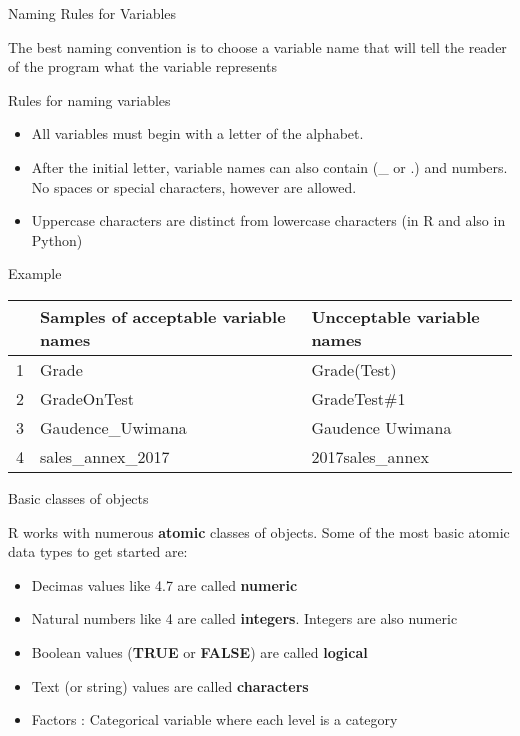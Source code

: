 \documentclass[ignorenonframetext,]{beamer}
\providecommand{\tightlist}{%
  \setlength{\itemsep}{0pt}\setlength{\parskip}{0pt}}
\begin{document}
\begin{frame}{Naming Rules for Variables}

The best naming convention is to choose a variable name that will tell
the reader of the program what the variable represents

\begin{block}{Rules for naming variables}

\begin{itemize}
\tightlist
\item
  All variables must begin with a letter of the alphabet.
\item
  After the initial letter, variable names can also contain (\_ or .)
  and numbers. No spaces or special characters, however are allowed.
\item
  Uppercase characters are distinct from lowercase characters (in R and
  also in Python)
\end{itemize}

\end{block}

\begin{block}{Example}

\begin{table}[ht]
\centering
\begin{tabular}{rll}
  \hline
& Samples of acceptable variable names & Uncceptable variable names \\ 
  \hline
1 & Grade & Grade(Test) \\ 
  2 & GradeOnTest & GradeTest\#1 \\ 
  3 & Gaudence\_Uwimana & Gaudence Uwimana \\ 
  4 & sales\_annex\_2017 & 2017sales\_annex \\ 
   \hline
\end{tabular}
\end{table}

\end{block}

\end{frame}

\begin{frame}{Basic classes of objects}

R works with numerous \textbf{atomic} classes of objects. Some of the
most basic atomic data types to get started are:

\begin{itemize}
\tightlist
\item
  Decimas values like 4.7 are called \textbf{numeric}
\item
  Natural numbers like 4 are called \textbf{integers}. Integers are also
  numeric
\item
  Boolean values (\textbf{TRUE} or \textbf{FALSE}) are called
  \textbf{logical}
\item
  Text (or string) values are called \textbf{characters}
\item
  Factors : Categorical variable where each level is a category
\end{itemize}

\end{frame}
\end{document}
